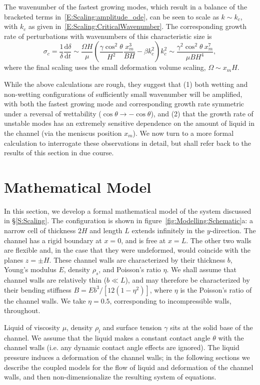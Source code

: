\documentclass{jfm}
\newcommand{\dd}[2]{\frac{\mathrm{d} #1}{\mathrm{d} #2}}
\newcommand{\poisson}{\eta} %
\begin{document}
The wavenumber of the fastest growing modes, which result in a balance of the bracketed terms in~\eqref{E:Scaling:amplitude_ode}, can be seen to scale as $k \sim k_c$, with $k_c$ as given in~\eqref{E:Scaling:CriticalWavenumber}. The corresponding growth rate of perturbations with wavenumbers of this characteristic size is
\begin{equation}\label{E:Scaling:SigmaScaling1}
\sigma_c =  \frac{1}{\delta} \dd{\delta}{t} \sim \frac{\Omega H}{\mu}\left(\frac{\gamma \cos^2 \theta}{H^2}\frac{x_m^3}{B H} - \beta k_c^2\right)k_c^2 \sim \frac{\gamma^2 \cos^2 \theta ~ x_m^7}{\mu B H^{4}},
\end{equation}
where the final scaling uses the small deformation volume scaling, $\Omega \sim x_m H$. 

While the above calculations are rough, they suggest that (1) both wetting and non-wetting configurations of sufficiently small wavenumber will be amplified, with both the fastest growing mode and corresponding growth rate symmetric under a reversal of wettability ($\cos \theta \to -\cos \theta$), and (2) that the growth rate of unstable modes has an extremely sensitive dependence on the amount of liquid in the channel (via the meniscus position $x_m$). We now turn to a more formal calculation to interrogate these observations in detail, but shall refer back to the results of this section in due course.

\section{Mathematical Model}
In this section, we develop a formal mathematical model of the system discussed in \S\ref{S:Scaling}. The configuration is shown in figure~\ref{fig:Modelling:Schematic}a: a narrow cell of thickness $2H$ and length $L$ extends infinitely in the $y$-direction. The channel has a rigid boundary at $x = 0$, and is free at $x = L$. The other two walls are flexible and, in the case that they were undeformed, would coincide with the planes $z = \pm H$. These channel walls are characterized by their thickness $b$, Young's modulus $E$, density $\rho_s$, and Poisson's ratio $\poisson$. We shall assume that channel walls are relatively thin ($b \ll L$), and may therefore be characterized by their bending stiffness $B = Eb^3 / [12(1-\poisson^2)]$, where $\poisson$ is the Poisson's ratio of the channel walls. We take $\eta = 0.5$, corresponding to incompressible walls, throughout.

Liquid of viscosity $\mu$, density $\rho_l$ and surface tension $\gamma$ sits at the solid base of the channel. We assume that the liquid makes a constant contact angle $\theta$ with the channel walls (i.e. any dynamic contact angle effects are ignored). The liquid pressure induces a deformation of the channel walls; in the following sections we describe the coupled models for the flow of liquid and deformation of the channel walls, and then non-dimensionalize the resulting system of equations.
\end{document}
